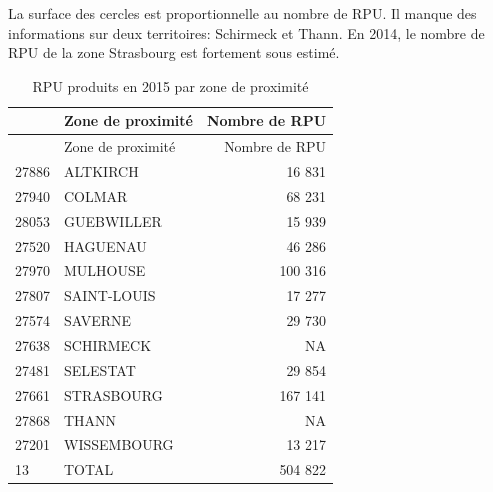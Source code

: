 \documentclass[]{article}
\begin{document}
La surface des cercles est proportionnelle au nombre de RPU. Il manque
des informations sur deux territoires: Schirmeck et Thann. En 2014, le
nombre de RPU de la zone Strasbourg est fortement sous estimé.

\begin{longtable}[c]{@{}llr@{}}
\caption{RPU produits en 2015 par zone de proximité}\tabularnewline
\toprule
& Zone de proximité & Nombre de RPU\tabularnewline
\midrule
\endfirsthead
\toprule
& Zone de proximité & Nombre de RPU\tabularnewline
\midrule
\endhead
27886 & ALTKIRCH & 16 831\tabularnewline
27940 & COLMAR & 68 231\tabularnewline
28053 & GUEBWILLER & 15 939\tabularnewline
27520 & HAGUENAU & 46 286\tabularnewline
27970 & MULHOUSE & 100 316\tabularnewline
27807 & SAINT-LOUIS & 17 277\tabularnewline
27574 & SAVERNE & 29 730\tabularnewline
27638 & SCHIRMECK & NA\tabularnewline
27481 & SELESTAT & 29 854\tabularnewline
27661 & STRASBOURG & 167 141\tabularnewline
27868 & THANN & NA\tabularnewline
27201 & WISSEMBOURG & 13 217\tabularnewline
13 & TOTAL & 504 822\tabularnewline
\bottomrule
\end{longtable}
\end{document}
